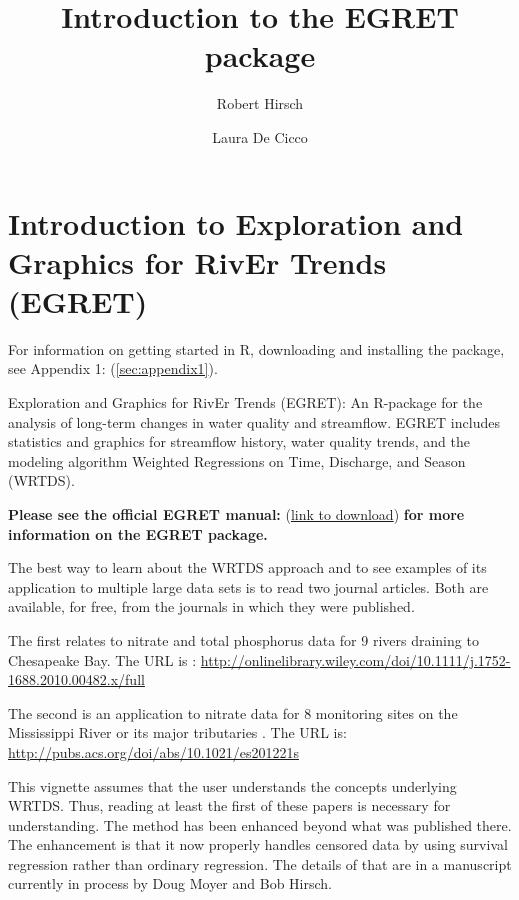 \documentclass[a4paper,11pt]{article}
\begin{document}


\title{Introduction to the EGRET package}
\author[1]{Robert Hirsch}
\author[1]{Laura De Cicco}



\maketitle
\tableofcontents

\section{Introduction to Exploration and Graphics for RivEr Trends (EGRET)}

For information on getting started in R, downloading and installing the package, see Appendix 1: (\ref{sec:appendix1}).

Exploration and Graphics for RivEr Trends (EGRET): An R-package for the analysis of long-term changes in water quality and streamflow. EGRET includes statistics and graphics for streamflow history, water quality trends, and the modeling algorithm Weighted Regressions on Time, Discharge, and Season (WRTDS). 

\textbf{Please see the official EGRET manual:}
(\href{https://github.com/USGS-R/EGRET/raw/Documentation/EGRET%2Bmanual_4.doc}{link to download}) 
\textbf{for more information on the EGRET package.}


The best way to learn about the WRTDS approach and to see examples of its application to multiple large data sets is to read two journal articles.  Both are available, for free, from the journals in which they were published.

The first relates to nitrate and total phosphorus data for 9 rivers draining to Chesapeake Bay.  The URL is \cite{HirschII}: 
\url{http://onlinelibrary.wiley.com/doi/10.1111/j.1752-1688.2010.00482.x/full}

The second is an application to nitrate data for 8 monitoring sites on the Mississippi River or its major tributaries \cite{HirschIII}.  The URL is: \url{http://pubs.acs.org/doi/abs/10.1021/es201221s}

This vignette assumes that the user understands the concepts underlying WRTDS.  Thus, reading at least the first of these papers is necessary for understanding.  The method has been enhanced beyond what was published there.  The enhancement is that it now properly handles censored data by using survival regression rather than ordinary regression.  The details of that are in a manuscript currently in process by Doug Moyer and Bob Hirsch.
\end{document}
